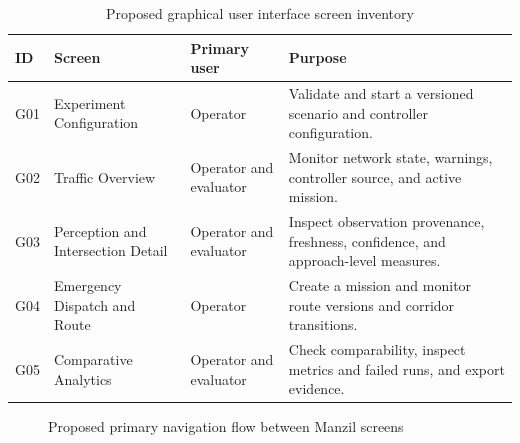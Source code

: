 \begin{table}[htbp]
\centering
\caption{Proposed graphical user interface screen inventory}
\label{tab:gui-screens}
\begin{tabularx}{\textwidth}{p{}p{}p{}Y}
\toprule
\textbf{ID} & \textbf{Screen} & \textbf{Primary user} & \textbf{Purpose}\\
\midrule
G01 & Experiment Configuration & Operator & Validate and start a versioned scenario and controller configuration.\\
G02 & Traffic Overview & Operator and evaluator & Monitor network state, warnings, controller source, and active mission.\\
G03 & Perception and Intersection Detail & Operator and evaluator & Inspect observation provenance, freshness, confidence, and approach-level measures.\\
G04 & Emergency Dispatch and Route & Operator & Create a mission and monitor route versions and corridor transitions.\\
G05 & Comparative Analytics & Operator and evaluator & Check comparability, inspect metrics and failed runs, and export evidence.\\
\bottomrule
\end{tabularx}
\end{table}

\begin{figure}[htbp]
\centering
{}
\caption{Proposed primary navigation flow between Manzil screens}
\label{fig:gui-navigation}
\end{figure}

